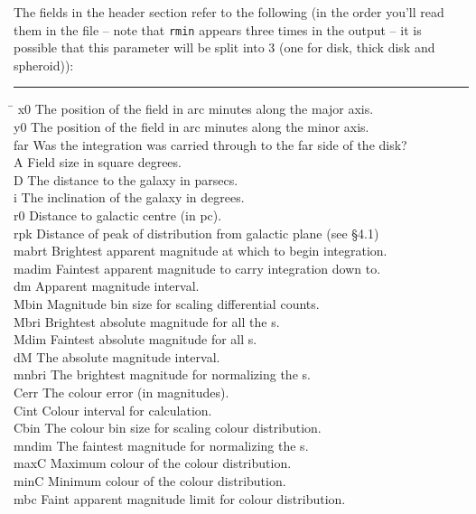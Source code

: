 The fields in the header section refer to the following (in the order you'll
read them in the file -- note that {\tt rmin} appears three times in the 
output -- it is possible that this parameter will be split into 3 (one for 
disk, thick disk and spheroid)):
\begin{tabbing}
\rule{2cm}{0cm} \= \kill
x0  \> The position of the field in arc minutes along the major axis. \\
y0  \> The position of the field in arc minutes along the minor axis. \\
far \> Was the integration was carried through to the far side of the disk? \\
A   \> Field size in square degrees. \\
D   \> The distance to the galaxy in parsecs. \\
i   \> The inclination of the galaxy in degrees. \\
r0  \> Distance to galactic centre (in pc). \\
rpk \> Distance of peak of distribution from galactic plane (see \S 4.1) \\
mabrt \> Brightest apparent magnitude at which to begin integration.\\
madim \> Faintest apparent magnitude to carry integration down to.\\
dm    \> Apparent magnitude interval. \\
Mbin  \> Magnitude bin size for scaling differential counts. \\
Mbri  \> Brightest absolute magnitude for all the \lf s. \\
Mdim  \> Faintest absolute magnitude for all \lf s.\\
dM    \> The absolute magnitude interval. \\
mnbri \> The brightest magnitude for normalizing the \lf s.\\
Cerr  \> The colour error (in magnitudes). \\
Cint  \> Colour interval for calculation. \\
Cbin  \> The colour bin size for scaling colour distribution. \\
mndim \> The faintest magnitude for normalizing the \lf s.\\
maxC  \> Maximum colour of the colour distribution.\\
minC  \> Minimum colour of the colour distribution. \\
mbc   \> Faint apparent magnitude limit for colour distribution. \\

\end{tabbing}
